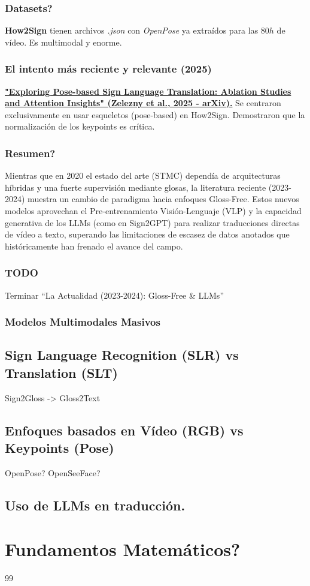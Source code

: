\documentclass[11pt,a4paper]{article}
\begin{document}
\subsubsection*{Datasets?}
\textbf{How2Sign} tienen archivos \emph{.json} con \emph{OpenPose} ya extraídos para las $80h$ de vídeo. Es multimodal y enorme.

\subsubsection*{El intento más reciente y relevante (2025)}
\href{https://arxiv.org/abs/2507.01532v1}{\textbf{"Exploring Pose-based Sign Language Translation: Ablation Studies and Attention Insights" (Zelezny et al., 2025 - arXiv).}} Se centraron exclusivamente en usar esqueletos (pose-based) en How2Sign. Demostraron que la normalización de los keypoints es crítica.

\subsubsection{Resumen?}
Mientras que en 2020 el estado del arte (STMC) dependía de arquitecturas híbridas y una fuerte supervisión mediante glosas, la literatura reciente (2023-2024) muestra un cambio de paradigma hacia enfoques Gloss-Free. Estos nuevos modelos aprovechan el Pre-entrenamiento Visión-Lenguaje (VLP) y la capacidad generativa de los LLMs (como en Sign2GPT) para realizar traducciones directas de vídeo a texto, superando las limitaciones de escasez de datos anotados que históricamente han frenado el avance del campo.

\subsubsection{TODO}

Terminar ``La Actualidad (2023-2024): Gloss-Free \& LLMs''


\subsubsection*{Modelos Multimodales Masivos}

\subsection*{Sign Language Recognition (SLR) vs Translation (SLT)}
Sign2Gloss -> Gloss2Text

\subsection*{Enfoques basados en Vídeo (RGB) vs Keypoints (Pose)}
OpenPose? OpenSeeFace?

\subsection*{Uso de LLMs en traducción.}

\section{Fundamentos Matemáticos?}

\newpage
{}
\begin{thebibliography}{99}

\end{thebibliography}
\end{document}
